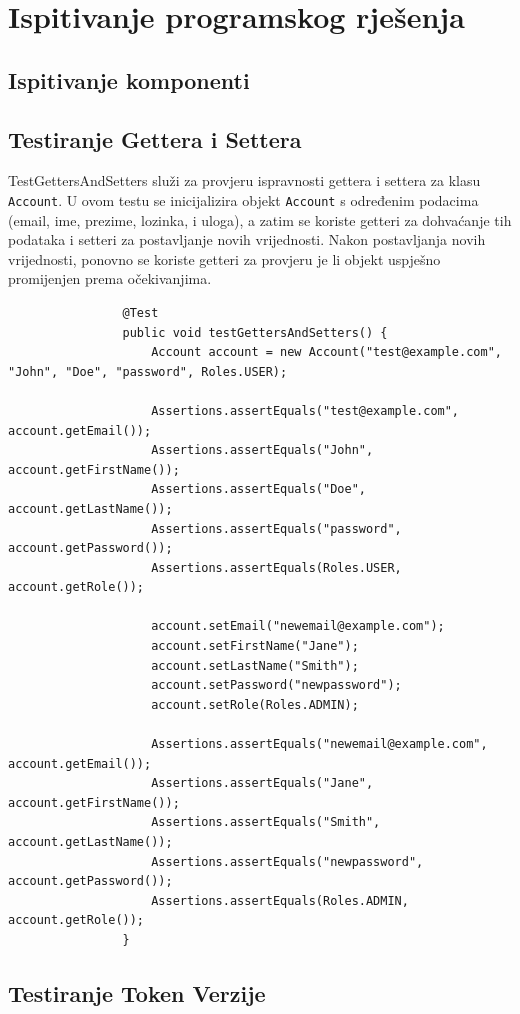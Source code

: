 			
			\eject 
		
	
		\section{Ispitivanje programskog rješenja}

			\subsection{Ispitivanje komponenti}
			
						\subsection{Testiranje Gettera i Settera}
			
			TestGettersAndSetters služi za provjeru ispravnosti gettera i settera za klasu \texttt{Account}. U ovom testu se inicijalizira objekt \texttt{Account} s određenim podacima (email, ime, prezime, lozinka, i uloga), a zatim se koriste getteri za dohvaćanje tih podataka i setteri za postavljanje novih vrijednosti. Nakon postavljanja novih vrijednosti, ponovno se koriste getteri za provjeru je li objekt uspješno promijenjen prema očekivanjima.
			
			\begin{lstlisting}
				@Test
				public void testGettersAndSetters() {
					Account account = new Account("test@example.com", "John", "Doe", "password", Roles.USER);
					
					Assertions.assertEquals("test@example.com", account.getEmail());
					Assertions.assertEquals("John", account.getFirstName());
					Assertions.assertEquals("Doe", account.getLastName());
					Assertions.assertEquals("password", account.getPassword());
					Assertions.assertEquals(Roles.USER, account.getRole());
					
					account.setEmail("newemail@example.com");
					account.setFirstName("Jane");
					account.setLastName("Smith");
					account.setPassword("newpassword");
					account.setRole(Roles.ADMIN);
					
					Assertions.assertEquals("newemail@example.com", account.getEmail());
					Assertions.assertEquals("Jane", account.getFirstName());
					Assertions.assertEquals("Smith", account.getLastName());
					Assertions.assertEquals("newpassword", account.getPassword());
					Assertions.assertEquals(Roles.ADMIN, account.getRole());
				}
			\end{lstlisting}
			
			\subsection{Testiranje Token Verzije}
			
